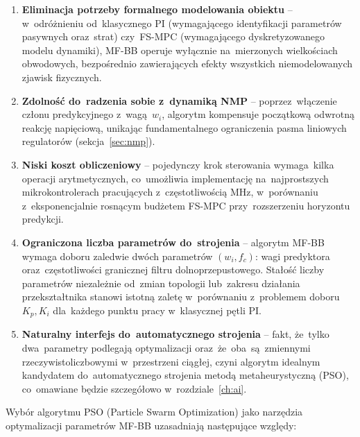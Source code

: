 \begin{enumerate}
    \item \textbf{Eliminacja potrzeby formalnego modelowania obiektu} -- w~odróżnieniu od~klasycznego PI (wymagającego identyfikacji parametrów pasywnych oraz~strat) czy~FS-MPC (wymagającego dyskretyzowanego modelu dynamiki), MF-BB operuje wyłącznie na~mierzonych wielkościach obwodowych, bezpośrednio zawierających efekty wszystkich niemodelowanych zjawisk fizycznych.
    
    \item \textbf{Zdolność do~radzenia sobie z~dynamiką NMP} -- poprzez~włączenie członu predykcyjnego z~wagą~$w_i$, algorytm kompensuje początkową odwrotną reakcję napięciową, unikając fundamentalnego ograniczenia pasma liniowych regulatorów (sekcja~\ref{sec:nmp}).
    
    \item \textbf{Niski koszt obliczeniowy} -- pojedynczy krok sterowania wymaga~kilka operacji arytmetycznych, co~umożliwia implementację na~najprostszych mikrokontrolerach pracujących z~częstotliwością MHz, w~porównaniu z~eksponencjalnie rosnącym budżetem FS-MPC przy~rozszerzeniu horyzontu predykcji.
    
    \item \textbf{Ograniczona liczba parametrów do~strojenia} -- algorytm MF-BB wymaga doboru zaledwie dwóch parametrów $(w_i, f_c)$: wagi predyktora oraz~częstotliwości granicznej filtru dolnoprzepustowego. Stałość liczby parametrów niezależnie od~zmian topologii lub~zakresu działania przekształtnika stanowi istotną zaletę w~porównaniu z~problemem doboru~$K_p, K_i$ dla~każdego punktu pracy w~klasycznej pętli PI.
    
    \item \textbf{Naturalny interfejs do~automatycznego strojenia} -- fakt, że~tylko dwa~parametry podlegają optymalizacji oraz~że~oba~są~zmiennymi rzeczywistoliczbowymi w~przestrzeni ciągłej, czyni algorytm idealnym kandydatem do~automatycznego strojenia metodą metaheurystyczną (PSO), co~omawiane będzie szczegółowo w~rozdziale~\ref{ch:ai}.
\end{enumerate}

Wybór algorytmu PSO (Particle Swarm Optimization) jako narzędzia optymalizacji parametrów MF-BB uzasadniają następujące względy:

